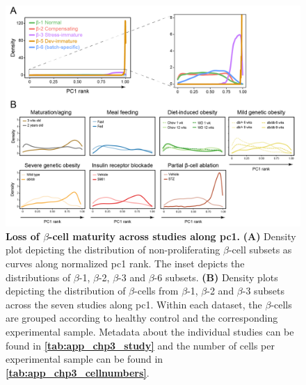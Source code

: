 \begin{figure}[H]
\centering
\includegraphics[width=14cm]{Appendix2/Fig/F3-7-02.png}
\caption[Loss of $\beta$-cell maturity across studies along 1]{\textbf{Loss of $\beta$-cell maturity across studies along \gls{pc}1.} \textbf{(A)} Density plot depicting the distribution of non-proliferating $\beta$-cell subsets as curves along normalized \gls{pc}1 rank. The inset depicts the distributions of $\beta$-1, $\beta$-2, $\beta$-3 and $\beta$-6 subsets. \textbf{(B)} Density plots depicting the distribution of $\beta$-cells from $\beta$-1, $\beta$-2 and $\beta$-3 subsets across the seven studies along \gls{pc}1. Within each dataset, the $\beta$-cells are grouped according to healthy control and the corresponding experimental sample. Metadata about the individual studies can be found in \textbf{\autoref{tab:app_chp3_study}} and the number of cells per experimental sample can be found in \textbf{\autoref{tab:app_chp3_cellnumbers}}.}
\label{fig:app_chp3_pc1}
\end{figure}

\clearpage



